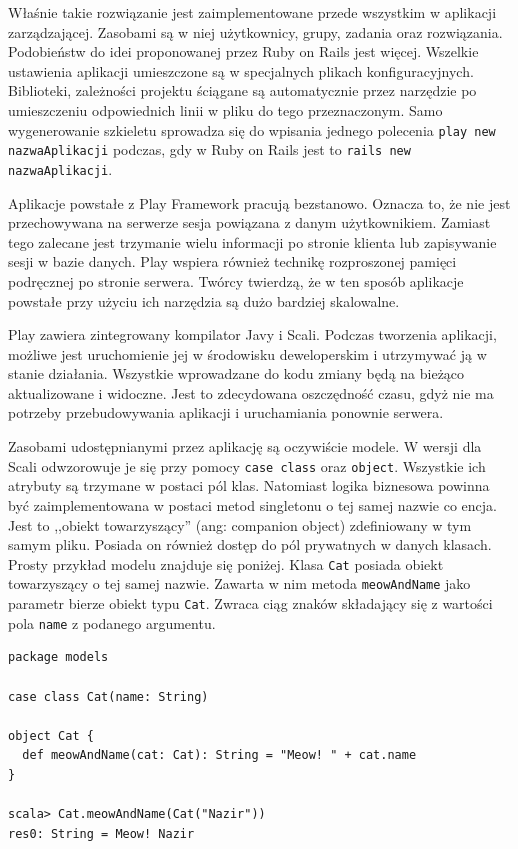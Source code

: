 \documentclass[brudnopis]{xmgr}
\begin{document}
Właśnie takie rozwiązanie jest zaimplementowane przede wszystkim w aplikacji zarządzającej. Zasobami są w niej użytkownicy, grupy, zadania oraz rozwiązania. Podobieństw do idei proponowanej przez Ruby on Rails jest więcej. Wszelkie ustawienia aplikacji umieszczone są w specjalnych plikach konfiguracyjnych. Biblioteki, zależności projektu ściągane są automatycznie przez narzędzie po umieszczeniu odpowiednich linii w pliku do tego przeznaczonym. Samo wygenerowanie szkieletu sprowadza się do wpisania jednego polecenia \texttt{play new nazwaAplikacji} podczas, gdy w Ruby on Rails jest to \texttt{rails new nazwaAplikacji}.

Aplikacje powstałe z Play Framework pracują bezstanowo. Oznacza to, że nie jest przechowywana na serwerze sesja powiązana z danym użytkownikiem. Zamiast tego zalecane jest trzymanie wielu informacji po stronie klienta lub zapisywanie sesji w bazie danych. Play wspiera również technikę rozproszonej pamięci podręcznej po stronie serwera. Twórcy twierdzą, że w ten sposób aplikacje powstałe przy użyciu ich narzędzia są dużo bardziej skalowalne.

Play zawiera zintegrowany kompilator Javy i Scali. Podczas tworzenia aplikacji, możliwe jest uruchomienie jej w środowisku deweloperskim i utrzymywać ją w stanie działania. Wszystkie wprowadzane do kodu zmiany będą na bieżąco aktualizowane i widoczne. Jest to zdecydowana oszczędność czasu, gdyż nie ma potrzeby przebudowywania aplikacji i uruchamiania ponownie serwera. 

Zasobami udostępnianymi przez aplikację są oczywiście modele. W wersji dla Scali odwzorowuje je się przy pomocy \texttt{case class} oraz \texttt{object}. Wszystkie ich atrybuty są trzymane w postaci pól klas. Natomiast logika biznesowa powinna być zaimplementowana w postaci metod singletonu o tej samej nazwie co encja. Jest to ,,obiekt towarzyszący'' (ang: companion object) zdefiniowany w tym samym pliku. Posiada on również dostęp do pól prywatnych w danych klasach. Prosty przykład modelu znajduje się poniżej. Klasa \texttt{Cat} posiada obiekt towarzyszący o tej samej nazwie. Zawarta w nim metoda \texttt{meowAndName} jako parametr bierze obiekt typu \texttt{Cat}. Zwraca ciąg znaków składający się z wartości pola \texttt{name} z podanego argumentu.

\begin{verbatim}
package models

case class Cat(name: String)

object Cat {
  def meowAndName(cat: Cat): String = "Meow! " + cat.name
}

scala> Cat.meowAndName(Cat("Nazir"))
res0: String = Meow! Nazir
\end{verbatim}
\end{document}
